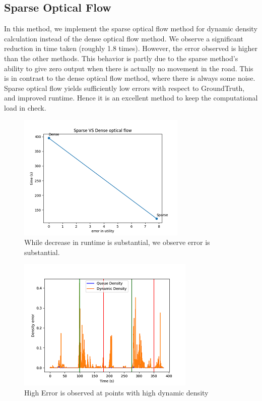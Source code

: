 \documentclass[conference]{IEEEtran}
\begin{document}
\subsection{Sparse Optical Flow}

In this method, we implement the sparse optical flow method for dynamic density calculation instead of the dense optical flow method.
We observe a significant reduction in time taken (roughly 1.8 times). However, the error observed is higher than the other methods.
This behavior is partly due to the sparse method's ability to give zero output when there is actually no movement in the road. This is in contrast to the dense optical flow method,
where there is always some noise. Sparse optical flow yields sufficiently low errors with respect to GroundTruth, and improved runtime. Hence it is an excellent method to keep the computational load in check.

\begin{figure}[htbp]
\centerline{\includegraphics{plots/plot_sparse_optical.png}}
\caption{While decrease in runtime is substantial, we observe error is substantial.}
\label{sof_pvt} 
\end{figure}

\begin{figure}[htbp]
\centerline{\includegraphics{plots/plot_sparse_dense.png}}
\caption{High Error is observed at points with high dynamic density}
\label{sparse_frame_error} 
\end{figure}
\end{document}
